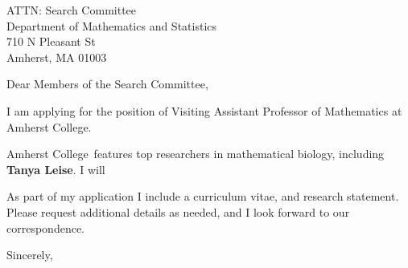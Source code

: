 \documentclass[11pt,a4paper]{letter}
\begin{document}

\def\School{Amherst College}

\begin{letter}
{ATTN: Search Committee\\
Department of Mathematics and Statistics\\
710 N Pleasant St\\
Amherst, MA 01003
}


\opening{Dear Members of the Search Committee,}

I am applying for the position of Visiting Assistant Professor of Mathematics at \School. 



\School~features top researchers in mathematical biology, including \textbf{Tanya Leise}. I will 



As part of my application I include a curriculum vitae, and research statement. Please request additional details as needed, and I look forward to our correspondence.

\closing{Sincerely,}
\end{letter}
\end{document}
